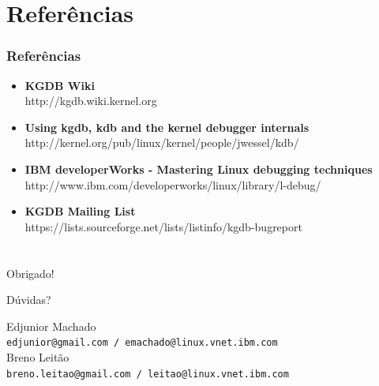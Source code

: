 \documentclass[xcolor=pdftex,dvipsnames,table]{beamer}
\begin{document}
\section{Referências}
\begin{frame}
       \frametitle{Referências}
        \begin{center}
        \begin{itemize}
		\item \textbf{KGDB Wiki} \\
		http://kgdb.wiki.kernel.org

		\item \textbf{Using kgdb, kdb and the kernel debugger internals} \\
		http://kernel.org/pub/linux/kernel/people/jwessel/kdb/

		\item \textbf{IBM developerWorks - Mastering Linux debugging techniques} \\
		http://www.ibm.com/developerworks/linux/library/l-debug/

		\item \textbf{KGDB Mailing List} \\
		https://lists.sourceforge.net/lists/listinfo/kgdb-bugreport
	\end{itemize}
        \end{center}
\end{frame}

\section{}
\begin{frame}
	\begin{center}
	\LARGE
	\alert{Obrigado!}

	Dúvidas?


	\vspace{2\baselineskip}

	\small
	Edjunior Machado \\ {\tt edjunior@gmail.com / emachado@linux.vnet.ibm.com} \\
	Breno Leitão \\ {\tt breno.leitao@gmail.com / leitao@linux.vnet.ibm.com}
	\end{center}
\end{frame}
\end{document}
